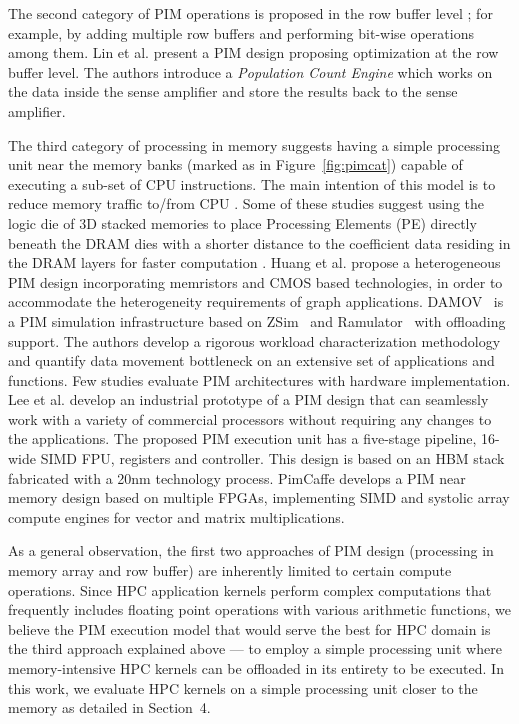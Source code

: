 The second category of PIM operations is proposed in the row buffer level ; for example, by adding multiple row buffers and performing bit-wise operations among them. Lin et al. \cite{31} present a PIM design proposing optimization at the row buffer level. The authors introduce a \textit{Population Count Engine} which works on the data inside the sense amplifier and store the results back to the sense amplifier.

The third category of processing in memory suggests having a simple processing unit near the memory banks (marked as  in Figure~\ref{fig:pimcat}) capable of executing a sub-set of CPU instructions. The main intention of this model is to reduce memory traffic to/from CPU \cite{01,02,05,11,12,17,30,32,33,34,35,71}. Some of these studies suggest using the logic die of 3D stacked memories to place Processing Elements (PE) directly beneath the DRAM dies with a shorter distance to the coefficient data residing in the DRAM layers for faster computation \cite{09,12,30,32}.  Huang et al. \cite{33} propose a heterogeneous PIM design incorporating memristors and CMOS based technologies, in order to accommodate the heterogeneity requirements of graph applications. DAMOV~\cite{71} is a PIM simulation infrastructure based on ZSim~\cite{zsim} and Ramulator~\cite{ramulator} with offloading support. The authors develop a rigorous workload characterization methodology and quantify data movement bottleneck on an extensive set of applications and functions. Few studies evaluate PIM architectures with hardware implementation. Lee et al. \cite{12} develop an industrial prototype of a PIM design that can seamlessly work with a variety of commercial processors without requiring any changes to the applications. The proposed PIM execution unit has a five-stage pipeline, 16-wide SIMD FPU, registers and controller. This design is based on an HBM stack fabricated with a 20nm technology process. PimCaffe \cite{16} develops a PIM near memory design based on multiple FPGAs, implementing SIMD and systolic array compute engines for vector and matrix multiplications.    

As a general observation, the first two approaches of PIM design (processing in memory array and row buffer) are inherently limited to certain compute operations. Since HPC application kernels perform complex computations that frequently includes floating point operations with various arithmetic functions, we believe the PIM execution model that would serve the best for HPC domain is the third approach explained above --- to employ a simple processing unit where memory-intensive HPC kernels can be offloaded in its entirety to be executed. In this work, we evaluate HPC kernels on a simple processing unit closer to the memory as detailed in Section~4. 

